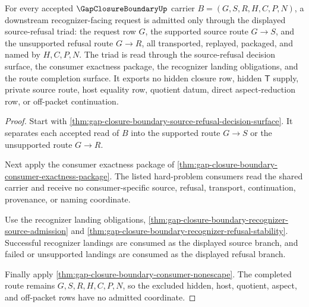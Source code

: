 \begin{theorem}
\label{thm:gap-closure-boundary-source-refusal-admission-triad}
For every accepted $\GapClosureBoundaryUp$ carrier $B=(G,S,R,H,C,P,N)$, a downstream recognizer-facing request is admitted only through the displayed source-refusal triad: the request row $G$, the supported source route $G \longrightarrow S$, and the unsupported refusal route $G \longrightarrow R$, all transported, replayed, packaged, and named by $H,C,P,N$. The triad is read through the source-refusal decision surface, the consumer exactness package, the recognizer landing obligations, and the route completion surface. It exports no hidden closure row, hidden $\mathsf{T}$ supply, private source route, host equality row, quotient datum, direct aspect-reduction row, or off-packet continuation.
\end{theorem}
\begin{proof}
Start with \autoref{thm:gap-closure-boundary-source-refusal-decision-surface}. It separates each accepted read of $B$ into the supported route $G \longrightarrow S$ or the unsupported route $G \longrightarrow R$.

Next apply the consumer exactness package of \autoref{thm:gap-closure-boundary-consumer-exactness-package}. The listed hard-problem consumers read the shared carrier and receive no consumer-specific source, refusal, transport, continuation, provenance, or naming coordinate.

Use the recognizer landing obligations, \autoref{thm:gap-closure-boundary-recognizer-source-admission} and \autoref{thm:gap-closure-boundary-recognizer-refusal-stability}. Successful recognizer landings are consumed as the displayed source branch, and failed or unsupported landings are consumed as the displayed refusal branch.

Finally apply \autoref{thm:gap-closure-boundary-consumer-nonescape}. The completed route remains $G,S,R,H,C,P,N$, so the excluded hidden, host, quotient, aspect, and off-packet rows have no admitted coordinate.
\end{proof}

